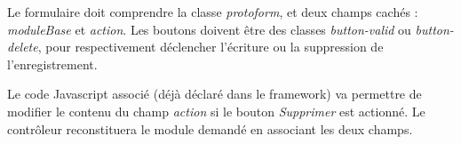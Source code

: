 Le formulaire doit comprendre la classe \textit{protoform}, et deux champs cachés : \textit{moduleBase} et \textit{action}. Les boutons doivent être des classes \textit{button-valid} ou \textit{button-delete}, pour respectivement déclencher l'écriture ou la suppression de l'enregistrement.

Le code Javascript associé (déjà déclaré dans le framework) va permettre de modifier le contenu du champ \textit{action} si le bouton \textit{Supprimer} est actionné. Le contrôleur reconstituera le module demandé en associant les deux champs.